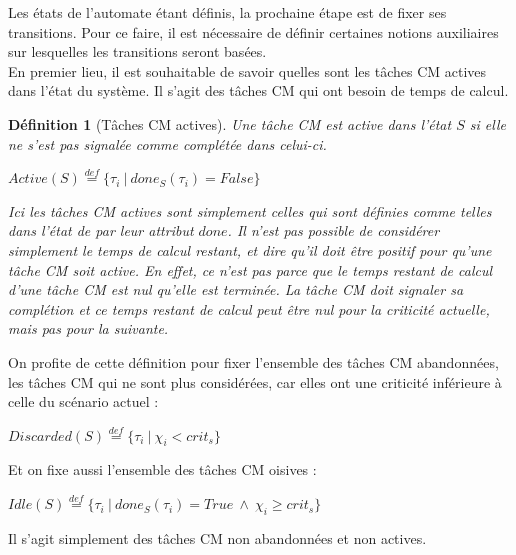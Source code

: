 \documentclass[12pt,a4paper,oneside]{book}
\theoremstyle{break}
\newtheorem{defin}{Définition}[chapter]
\theoremstyle{breakplain}
\begin{document}
Les états de l'automate étant définis, la prochaine étape est de fixer ses transitions. Pour ce faire, il est nécessaire de définir certaines notions auxiliaires sur lesquelles les transitions seront basées.\\

En premier lieu, il est souhaitable de savoir quelles sont les tâches CM actives dans l'état du système. Il s'agit des tâches CM qui ont besoin de temps de calcul.\\

\begin{defin}[Tâches CM actives]
\label{spo:act}
Une tâche CM est active dans l'état $S$ si elle ne s'est pas signalée comme complétée dans celui-ci.
\begin{center}
$Active(S) \overset{def}{=} \{\tau_i\ |\ done_S(\tau_i) = False \}$\\
\end{center}

Ici les tâches CM actives sont simplement celles qui sont définies comme telles dans l'état de par leur attribut $done$. Il n'est pas possible de considérer simplement le temps de calcul restant, et dire qu'il doit être positif pour qu'une tâche CM soit active. En effet, ce n'est pas parce que le temps restant de calcul d'une tâche CM est nul qu'elle est terminée. La tâche CM doit signaler sa complétion et ce temps restant de calcul peut être nul pour la criticité actuelle, mais pas pour la suivante.
\end{defin}

On profite de cette définition pour fixer l'ensemble des tâches CM abandonnées, les tâches CM qui ne sont plus considérées, car elles ont une criticité inférieure à celle du scénario actuel :
\begin{center}
$Discarded(S) \overset{def}{=} \{\tau_i\ |\ \chi_i < crit_s \}$\\
\end{center}

Et on fixe aussi l'ensemble des tâches CM oisives :

\begin{center}
$Idle(S) \overset{def}{=} \{\tau_i\ |\ done_S(\tau_i) = True\ \wedge\ \chi_i \geq crit_s \}$\\
\end{center}

Il s'agit simplement des tâches CM non abandonnées et non actives.\\
\end{document}
